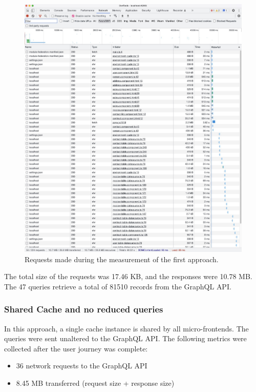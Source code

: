 \ifshowImages
\begin{figure}[H]
  \centering
  \includegraphics[width=0.8\linewidth]{images/results/1-attempt/no-shared-cache-no-reduction.jpg}
  \caption{Requests made during the measurement of the first approach.}\label{fig:results:no-shared-cache-no-reduction}
\end{figure}
\fi

\noindent The total size of the requests was 17.46 KB, and the responses were 10.78 MB. The 47 queries retrieve a total of 81510 records from the GraphQL  \ac{API}.

\subsubsection{Shared Cache and no reduced queries}\label{subsubsection:results:performance-measurement:shared-cache-no-reduction}

In this approach, a single cache instance is shared by all micro-frontends. The queries were sent unaltered to the GraphQL \ac{API}. The following metrics were collected after the user journey was complete:

\begin{itemize}
  \item 36 network requests to the GraphQL \ac{API}
  \item 8.45 MB transferred (request size + response size)
\end{itemize}


